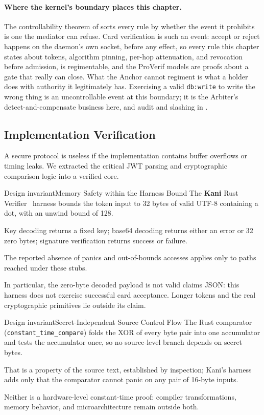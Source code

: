 \documentclass[11pt,a4paper]{article}
\theoremstyle{definition}
\begin{document}
\paragraph{Where the kernel's boundary places this chapter.} The controllability theorem of  sorts every rule by whether the event it prohibits is one the mediator can refuse. Card verification is such an event: accept or reject happens on the daemon's own socket, before any effect, so every rule this chapter states about tokens, algorithm pinning, per-hop attenuation, and revocation before admission, is regimentable, and the ProVerif models are proofs about a gate that really can close. What the Anchor cannot regiment is what a holder does with authority it legitimately has. Exercising a valid \texttt{db:write} to write the wrong thing is an uncontrollable event at this boundary; it is the Arbiter's detect-and-compensate business here, and audit and slashing in .

\subsection{Implementation Verification}

A secure protocol is useless if the implementation contains buffer overflows or timing leaks. We extracted the critical JWT parsing and cryptographic comparison logic into a verified core.

\begin{pdclaim}{Design invariant}{Memory Safety within the Harness Bound}
\setlength{\parskip}{4pt plus 1pt}
\label{inv:anchor-memory-safety}
The \textbf{Kani} Rust Verifier~ harness bounds the token input to 32 bytes of valid UTF-8 containing a dot, with an unwind bound of 128.

Key decoding returns a fixed key; base64 decoding returns either an error or 32 zero bytes; signature verification returns success or failure.

The reported absence of panics and out-of-bounds accesses applies only to paths reached under these stubs.

In particular, the zero-byte decoded payload is not valid claims JSON: this harness does not exercise successful card acceptance. Longer tokens and the real cryptographic primitives lie outside its claim.
\end{pdclaim}

\begin{pdclaim}{Design invariant}{Secret-Independent Source Control Flow}
\setlength{\parskip}{4pt plus 1pt}
\label{inv:anchor-ct-source}
The Rust comparator (\texttt{constant\_time\_compare}) folds the XOR of every byte pair into one accumulator and tests the accumulator once, so no source-level branch depends on secret bytes.

That is a property of the source text, established by inspection; Kani's harness adds only that the comparator cannot panic on any pair of 16-byte inputs.

Neither is a hardware-level constant-time proof: compiler transformations, memory behavior, and microarchitecture remain outside both.
\end{pdclaim}
\end{document}
